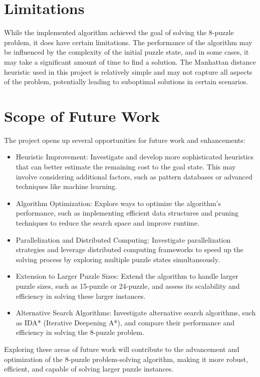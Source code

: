 \documentclass[12pt]{report}
\begin{document}
\section{Limitations}
While the implemented algorithm achieved the goal of solving the 8-puzzle problem, it does have certain limitations. The performance of the algorithm may be influenced by the complexity of the initial puzzle state, and in some cases, it may take a significant amount of time to find a solution. The Manhattan distance heuristic used in this project is relatively simple and may not capture all aspects of the problem, potentially leading to suboptimal solutions in certain scenarios.

\section{Scope of Future Work}
The project opens up several opportunities for future work and enhancements:

\begin{itemize}
\item Heuristic Improvement: Investigate and develop more sophisticated heuristics that can better estimate the remaining cost to the goal state. This may involve considering additional factors, such as pattern databases or advanced techniques like machine learning.

\item Algorithm Optimization: Explore ways to optimize the algorithm's performance, such as implementing efficient data structures and pruning techniques to reduce the search space and improve runtime.

\item Parallelization and Distributed Computing: Investigate parallelization strategies and leverage distributed computing frameworks to speed up the solving process by exploring multiple puzzle states simultaneously.

\item Extension to Larger Puzzle Sizes: Extend the algorithm to handle larger puzzle sizes, such as 15-puzzle or 24-puzzle, and assess its scalability and efficiency in solving these larger instances.

\item Alternative Search Algorithms: Investigate alternative search algorithms, such as IDA* (Iterative Deepening A*), and compare their performance and efficiency in solving the 8-puzzle problem.
\end{itemize}\newline
Exploring these areas of future work will contribute to the advancement and optimization of the 8-puzzle problem-solving algorithm, making it more robust, efficient, and capable of solving larger puzzle instances.
\end{document}
